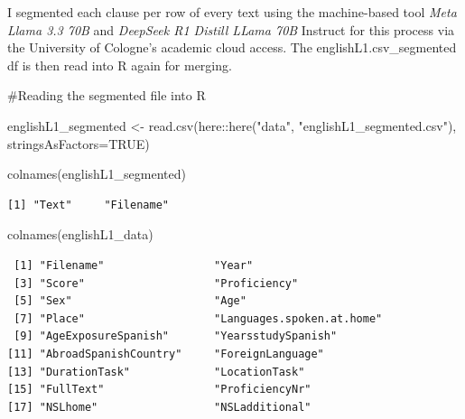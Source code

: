\documentclass[
  letterpaper,
  DIV=11,
  numbers=noendperiod]{scrartcl}
\newenvironment{Shaded}{\begin{snugshade}}{\end{snugshade}}
\newcommand{\AttributeTok}[1]{\textcolor[rgb]{0.40,0.45,0.13}{#1}}
\newcommand{\CommentTok}[1]{\textcolor[rgb]{0.37,0.37,0.37}{#1}}
\newcommand{\ConstantTok}[1]{\textcolor[rgb]{0.56,0.35,0.01}{#1}}
\newcommand{\FunctionTok}[1]{\textcolor[rgb]{0.28,0.35,0.67}{#1}}
\newcommand{\NormalTok}[1]{\textcolor[rgb]{0.00,0.23,0.31}{#1}}
\newcommand{\OtherTok}[1]{\textcolor[rgb]{0.00,0.23,0.31}{#1}}
\newcommand{\SpecialCharTok}[1]{\textcolor[rgb]{0.37,0.37,0.37}{#1}}
\newcommand{\StringTok}[1]{\textcolor[rgb]{0.13,0.47,0.30}{#1}}
\begin{document}
I segmented each clause per row of every text using the machine-based
tool \emph{Meta Llama 3.3 70B} and \emph{DeepSeek R1 Distill LLama 70B}
Instruct for this process via the University of Cologne's academic cloud
access. The englishL1.csv\_segmented df is then read into R again for
merging.

\begin{Shaded}
\begin{Highlighting}[]
\CommentTok{\#Reading the segmented file into R}

\NormalTok{englishL1\_segmented }\OtherTok{\textless{}{-}} \FunctionTok{read.csv}\NormalTok{(here}\SpecialCharTok{::}\FunctionTok{here}\NormalTok{(}\StringTok{"data"}\NormalTok{, }\StringTok{"englishL1\_segmented.csv"}\NormalTok{), }\AttributeTok{stringsAsFactors=}\ConstantTok{TRUE}\NormalTok{)}

\FunctionTok{colnames}\NormalTok{(englishL1\_segmented)}
\end{Highlighting}
\end{Shaded}

\begin{verbatim}
[1] "Text"     "Filename"
\end{verbatim}

\begin{Shaded}
\begin{Highlighting}[]
\FunctionTok{colnames}\NormalTok{(englishL1\_data) }
\end{Highlighting}
\end{Shaded}

\begin{verbatim}
 [1] "Filename"                 "Year"                    
 [3] "Score"                    "Proficiency"             
 [5] "Sex"                      "Age"                     
 [7] "Place"                    "Languages.spoken.at.home"
 [9] "AgeExposureSpanish"       "YearsstudySpanish"       
[11] "AbroadSpanishCountry"     "ForeignLanguage"         
[13] "DurationTask"             "LocationTask"            
[15] "FullText"                 "ProficiencyNr"           
[17] "NSLhome"                  "NSLadditional"           
\end{verbatim}
\end{document}
